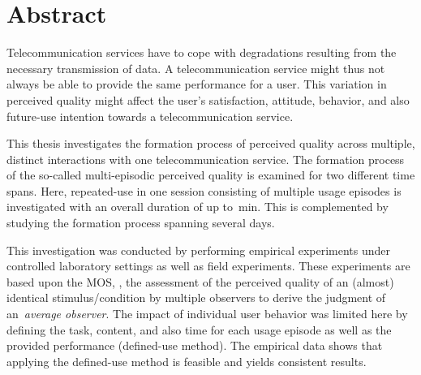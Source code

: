 
\chapter*{Abstract}
Telecommunication services have to cope with degradations resulting from the necessary transmission of data.
A telecommunication service might thus not always be able to provide the same performance for a user.
This variation in perceived quality might affect the user's satisfaction, attitude, behavior, and also future-use intention towards a telecommunication service.

This thesis investigates the formation process of perceived quality across multiple, distinct interactions with one telecommunication service.
The formation process of the so-called multi-episodic perceived quality is examined for two different time spans.
Here, repeated-use in one session consisting of multiple usage episodes is investigated with an overall duration of up to~\unit[45]{min}.
This is complemented by studying the formation process spanning several days.

This investigation was conducted by performing empirical experiments under controlled laboratory settings as well as field experiments.
These experiments are based upon the \acf{MOS}, \ie, the assessment of the perceived quality of an (almost) identical stimulus/condition by multiple observers to derive the judgment of an~\emph{average observer}.
The impact of individual user behavior was limited here by defining the task, content, and also time for each usage episode as well as the provided performance (defined-use method).
The empirical data shows that applying the defined-use method is feasible and yields consistent results.

